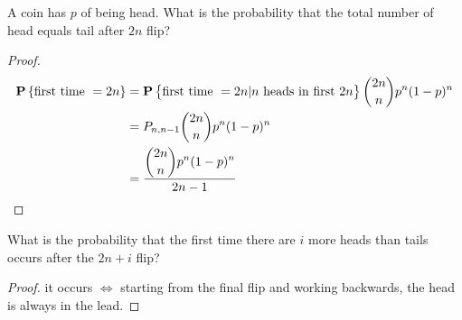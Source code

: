 \begin{example}
    A coin has $p$ of being head. What is the probability that the total number of head equals tail after $2n$ flip?    
\end{example}
\begin{proof}
    \begin{equation*}
        \begin{aligned}
            \mathop{\bf P\/}\displaystyle \left\{\text{first time } = 2n\right\} &= \mathop{\bf P\/}\displaystyle \left\{\text{first time } = 2n | n \text{ heads in first } 2n\right\} \binom{2n}{n} p^n (1-p)^n \\
            &= P_{n,n-1} \binom{2n}{n} p^n (1-p)^n \\
            &=  \frac{\displaystyle \binom{2n}{n} p^n (1-p)^n}{2n - 1}
        \end{aligned}
    \end{equation*}
\end{proof}

\begin{example}
    What is the probability that the first time there are $i$ more heads than tails occurs after the $2n+i$   flip?
\end{example}
\begin{proof}
    it occurs $\iff$ starting from the final flip and working backwards, the head is always in the lead.
\end{proof}






